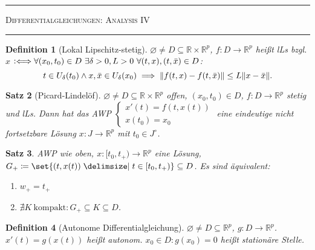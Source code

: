 \documentclass[a4paper]{article}
\newcounter{Sec}
\theoremstyle{marginbreak}
\newtheorem{definition}{Definition}[Sec]
\newtheorem{satz}[definition]{Satz}
\newcommand{\sep}{%
	\rule{\textwidth}{0.3pt}%
	\stepcounter{Sec}%
	}
\newcommand{\defiff}{\mathrel{\vcentcolon\Longleftrightarrow}}
\newcommand{\R}{\mathbb{R}}
\begin{document}
	\sep
	\newpage
	\textsc{Differentialgleichungen: Analysis IV}

	\sep
	\begin{definition}[Lokal Lipschitz-stetig]
		$\varnothing\neq D\subseteq \R\times\R^p$, $f\colon D\to\R^p$ heißt lLs bzgl. $x$
		$\defiff\forall(x_0, t_0)\in D~\exists\delta>0, L>0~\forall (t, x), (t, \bar{x})\in D$:
		\[
			t\in U_\delta(t_0)\wedge x, \bar{x}\in U_\delta(x_0)\implies\norm{f(t, x)-f(t, \bar{x})}\leq L\norm{x-\bar{x}}.
		\]
	\end{definition}
	\begin{satz}[Picard-Lindelöf]
		$\varnothing\neq D\subseteq\R\times\R^p$ offen, $(x_0, t_0)\in D$, $f\colon D\to\R^p$
		stetig und lLs. Dann hat das AWP $\begin{cases}x'(t)=f(t, x(t))\\x(t_0)=x_0\end{cases}$
		eine eindeutige nicht fortsetzbare Lösung $x\colon J\to\R^p$ mit $t_0\in J^\circ$.
	\end{satz}
	\begin{satz}
		AWP wie oben, $x\colon [t_0,t_+)\to\R^p$ eine Lösung, $G_+\coloneqq\set{(t, x(t))\given t\in[t_0,t_+)}\subseteq D$.
		Es sind äquivalent:
		\begin{enumerate}[label=(\alph*)]
			\item $w_+=t_+$
			\item $\nexists K~\text{kompakt}: G_+\subseteq K\subseteq D$.
		\end{enumerate}
	\end{satz}
	\begin{definition}[Autonome Differentialgleichung]
		$\varnothing\neq D\subseteq \R^p$, $g\colon D\to\R^p$. $x'(t)=g(x(t))$ heißt autonom. $x_0\in D: g(x_0)=0$ heißt
		stationäre Stelle.
	\end{definition}
\end{document}

